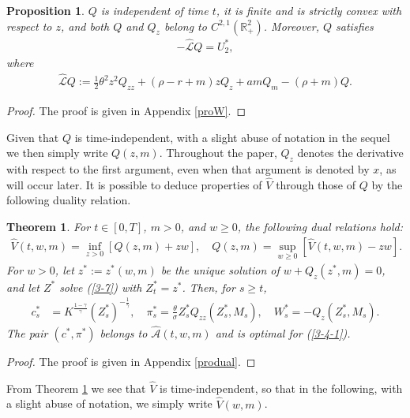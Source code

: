 \documentclass[a4paper,11pt]{amsart}
\numberwithin{equation}{section}
\newtheorem{theorem}{Theorem}[section]
\newtheorem{pro}{Proposition}[section]
\newcommand{\blue}[1]{{\color{black}#1}}
\begin{document}
\begin{pro}\label{Wregularity}
$Q$ is independent of time $t$, it is finite and is strictly convex with respect to $z$, and \blue{both $Q$ and $Q_z$ belong to $C^{2,1}(\mathbb{R}^2_+)$.} Moreover, $Q$ satisfies
\begin{align}\label{3-6-1}
-\widehat{\mathcal{L}}Q=U_2^\ast, 
\end{align}
where 
\begin{align*}
\widehat{\mathcal{L}}Q:= \frac{1}{2}\theta^2 z^2Q_{zz}+(\rho-r+m)zQ_z  +a m Q_m-(\rho+m)Q.
\end{align*}
\end{pro}

\begin{proof}
The proof is given in Appendix \ref{proW}.
\end{proof}
Given that $Q$ is time-independent, with a slight abuse of notation in the sequel we then simply write $Q(z,m)$. \blue{Throughout the paper, $Q_z$ denotes the derivative with respect to the first argument, even when that argument is denoted by $x$, as will occur later.} It is possible to deduce properties of $\widehat{V}$ through those of $Q$ by the following duality relation.
 
\begin{theorem}\label{dualityrelation}
\leavevmode
{\color{black}
For $t\in[0,T]$, $m>0$, and $w\geq0$, the following dual relations hold:
\begin{align*}
\widehat{V}(t,w,m) = \inf_{z >0} [ Q(z,m)+z w ], \quad Q(z,m) =  \sup_{w\geq0}[\widehat{V}(t,w,m)-zw].
\end{align*}
For $w>0$, let $z^\ast:=z^\ast(w,m)$ be the unique solution of $w+Q_z(z^\ast,m)=0$, and let $Z^\ast$ solve (\ref{3-7}) with $Z_t^\ast=z^\ast$. Then, for $s\geq t$,
\begin{align*}
c_s^\ast&=K^{\frac{1-\gamma}{\gamma}}(Z_s^\ast)^{-\frac{1}{\gamma}},\quad
\pi_s^\ast=\frac{\theta}{\sigma}Z_s^{\ast}Q_{zz}(Z_s^\ast,M_s),\quad
W_s^\ast=-Q_z(Z_s^\ast,M_s).
\end{align*}
The pair $(c^\ast,\pi^\ast)$ belongs to $\widehat{\mathcal A}(t,w,m)$ and is optimal for (\ref{3-4-1}).
}

\end{theorem}

\begin{proof}
The proof is given in Appendix \ref{produal}.
\end{proof}

From Theorem \ref{dualityrelation} we see that $\widehat{V}$ is time-independent, so that in the following, with a slight abuse of notation, we simply write $\widehat{V}(w,m)$. 
\end{document}
